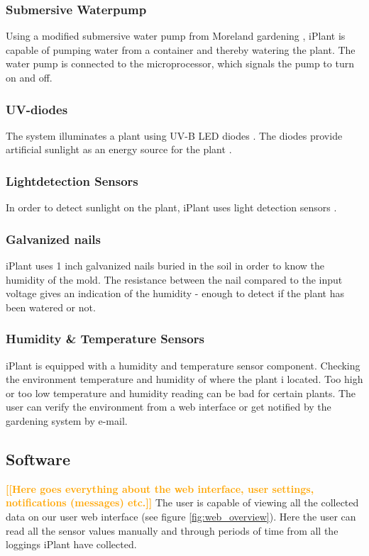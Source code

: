 \documentclass{ubicomp2012}
\newcommand{\todo}[1]{\textsf{\textbf{\textcolor{Orange}{[[#1]]}}}}
\begin{document}
\subsubsection{Submersive Waterpump}
Using a modified submersive water pump from Moreland gardening \cite{moreland}, iPlant is capable of pumping water from a container and thereby watering the plant. The water pump is connected to the microprocessor, which signals the pump to turn on and off.

\subsubsection{UV-diodes}
The system illuminates a plant using UV-B LED diodes \cite{uv-diodes}. The diodes provide artificial sunlight as an energy source for the plant \cite{fotosyntese}.

\subsubsection{Lightdetection Sensors}
In order to detect sunlight on the plant, iPlant uses light detection sensors \cite{light-sensors}. 

\subsubsection{Galvanized nails}
iPlant uses 1 inch galvanized nails buried in the soil in order to know the humidity of the mold. The resistance between the nail compared to the input voltage gives an indication of the humidity - enough to detect if the plant has been watered or not.

\subsubsection{Humidity \& Temperature Sensors}
iPlant is equipped with a humidity and temperature sensor component. Checking the environment temperature and humidity of where the plant i located. Too high or too low temperature and humidity reading can be bad for certain plants. The user can verify the environment from a web interface or get notified by the gardening system by e-mail.

\subsection{Software}
\todo{Here goes everything about the web interface, user settings, notifications (messages) etc.}
The user is capable of viewing all the collected data on our user web interface (see figure \ref{fig:web_overview}). Here the user can read all the sensor values manually and through periods of time from all the loggings iPlant have collected. 
\end{document}
